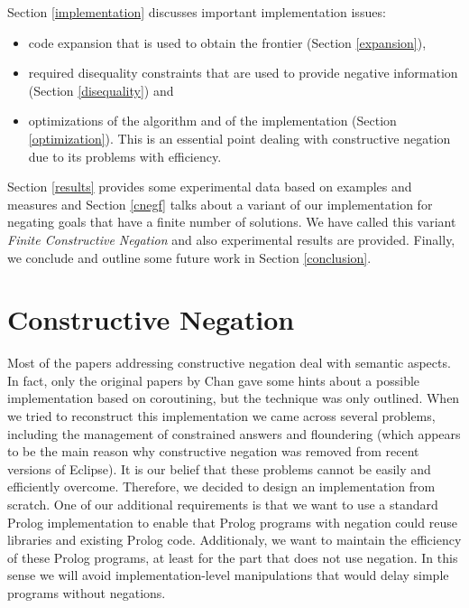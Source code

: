 \documentclass{tlp}
\begin{document}
Section \ref{implementation} discusses important implementation issues: 
\begin{itemize} 
      \item code expansion that is used to obtain the frontier (Section
\ref{expansion}),
      \item required disequality constraints that are used to provide negative
information (Section \ref{disequality}) and
      \item optimizations of the algorithm and of the implementation (Section
\ref{optimization}). This is an essential point dealing with constructive
negation due to its problems with efficiency.
\end{itemize} 

Section \ref{results} provides some experimental data based on examples and
measures and Section \ref{cnegf} talks about a variant of our implementation
for negating goals that have a finite number of solutions. We have called this
variant \emph{Finite Constructive Negation} and also experimental results are
provided. Finally, we conclude and outline some future work in Section
\ref{conclusion}.
 


\section{Constructive Negation}
\label{constructive}

Most of the papers addressing constructive negation deal with semantic
aspects. In fact, only the original papers by Chan gave some hints
about a possible implementation based on coroutining, but the
technique was only outlined. When we tried to reconstruct this
implementation we came across several problems, including the
management of constrained answers and floundering (which appears to be
the main reason why constructive negation was removed from recent
versions of Eclipse). It is our belief that these problems cannot be
easily and efficiently overcome. Therefore, we decided to design an
implementation from scratch.  One of our additional requirements is
that we want to use a standard Prolog implementation to enable that
Prolog programs with negation could reuse libraries and existing
Prolog code. Additionaly, we want to maintain the efficiency of these
Prolog programs, at least for the part that does not use negation.  In
this sense we will avoid implementation-level manipulations that would
delay simple programs without negations.
\end{document}
